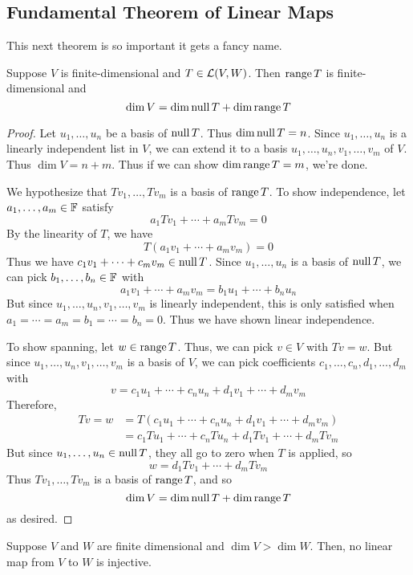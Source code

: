 \subsection*{Fundamental Theorem of Linear Maps}
This next theorem is so important it gets a fancy name.
\begin{theorem}
    Suppose $V$ is finite-dimensional and $T\in \mathcal{L}(V,W)$. Then $\operatorname{range} T$ is finite-dimensional and 
    \[ \dim V = \dim\operatorname{null} T + \dim\operatorname{range} T\]
\end{theorem}
\begin{proof}
    Let $u_1, \dots, u_n$ be a basis of $\operatorname{null} T$. Thus $\dim \operatorname{null} T = n$. Since $u_1, \dots, u_n$ is a linearly independent list in $V$, we can extend it to a basis $u_1, \dots, u_n, v_1, \dots, v_m$ of $V$. Thus $\dim V = n + m$. Thus if we can show $\dim \operatorname{range} T = m$, we're done.

    We hypothesize that $Tv_1, \dots, Tv_m$ is a basis of $\operatorname{range} T$. To show independence, let $a_1, \dots, a_m \in \mathbb F$ satisfy 
    \[ a_1 Tv_1 + \cdots + a_m Tv_m = 0\]
    By the linearity of $T$, we have 
    \[ T(a_1v_1 + \cdots + a_mv_m) = 0\]
    Thus we have $c_1v_1 + \cdots + c_mv_m\in \operatorname{null} T$. Since $u_1, \dots, u_n$ is a basis of $\operatorname{null} T$, we can pick $b_1, \dots, b_n\in \mathbb F$ with
    \[ a_1v_1 + \cdots + a_mv_m = b_1u_1 + \cdots + b_nu_n\]
    But since $u_1, \dots, u_n, v_1, \dots, v_m$ is linearly independent, this is only satisfied when $a_1 = \cdots = a_m = b_1 = \cdots = b_n = 0$. Thus we have shown linear independence.

    To show spanning, let $w\in \operatorname{range} T$. Thus, we can pick $v\in V$ with $Tv = w$. But since $u_1, \dots, u_n, v_1, \dots, v_m$ is a basis of $V$, we can pick coefficients $c_1, \dots, c_n, d_1, \dots, d_m$ with
    \[ v = c_1u_1 + \cdots + c_nu_n + d_1v_1 + \cdots + d_mv_m \]
    Therefore, 
    \begin{align*}
        Tv = w &= T(c_1u_1 + \cdots + c_nu_n + d_1v_1 + \cdots + d_mv_m) \\
        &= c_1Tu_1 + \cdots + c_nTu_n + d_1Tv_1 + \cdots + d_mTv_m
    \end{align*}
    But since $u_1, \dots, u_n \in \operatorname{null} T$, they all go to zero when $T$ is applied, so
    \[ w = d_1Tv_1 + \cdots + d_mTv_m\] 
    Thus $Tv_1, \dots, Tv_m$ is a basis of $\operatorname{range} T$, and so
    \[ \dim V = \dim \operatorname{null} T + \dim \operatorname{range} T\]
    as desired.
\end{proof}
\begin{theorem}
    Suppose $V$ and $W$ are finite dimensional and $\dim V > \dim W$. Then, no linear map from $V$ to $W$ is injective.
\end{theorem}

